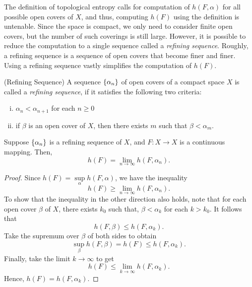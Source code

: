 \documentclass[12pt,twoside,draft]{book}
\begin{document}
The definition of topological entropy calls for computation of $h(F,\alpha)$ for all possible open covers of $X$, and thus, computing $h(F)$ using the definition is untenable.
Since the space is compact, we only need to consider finite open covers, but the number of such coverings is still large.
However, it is possible to reduce the computation to a single sequence called a \textit{refining sequence}.
Roughly, a refining sequence is a sequence of open covers that become finer and finer.
Using a refining sequence vastly simplifies the computation of $h(F)$.
\begin{definition}
  (Refining Sequence)
  A sequence $\left \{ \alpha_n \right \}$ of open covers of a compact space $X$ is called a \textit{refining sequence}, if it satisfies the following two criteria:
  \begin{enumerate}[(i)]
    \item $\alpha_n < \alpha_{n+1}$ for each $n\geq 0$
    \item if $\beta$ is an open cover of $X$, then there exists $m$ such that $\beta < \alpha_m$.
  \end{enumerate}
\end{definition}
\begin{theorem}
  Suppose $\left \{ \alpha_n \right \}$ is a refining sequence of $X$, and $F:X\to X$ is a continuous mapping.
  Then,
  \begin{equation*}
    h(F) = \lim\limits_{n\to \infty} h(F, \alpha_n).
  \end{equation*}
  \label{thm:t-ent-ref-seq}
  \begin{proof}
    Since $h(F) = \sup\limits_{\alpha} h(F, \alpha)$, we have the inequality
    \begin{equation*}
      h(F) \geq \lim\limits_{n\to \infty} h(F, \alpha_n).
    \end{equation*}
    To show that the inequality in the other direction also holds, note that for each open cover $\beta$ of $X$, there exists $k_0$ such that, $\beta < \alpha_k$ for each $k > k_0$.
    It follows that
    \begin{equation*}
      h(F, \beta) \leq h(F, \alpha_k).
    \end{equation*}
    Take the supremum over $\beta$ of both sides to obtain
    \begin{equation*}
      \sup\limits_{\beta} h(F, \beta) = h(F) \leq h(F, \alpha_k).
    \end{equation*}
    Finally, take the limit $k \to \infty$ to get
    \begin{equation*}
      h(F) \leq \lim\limits_{k \to \infty} h(F, \alpha_k).
    \end{equation*}
    Hence, $h(F) = h(F, \alpha_k)$.
  \end{proof}
\end{theorem}
\end{document}
